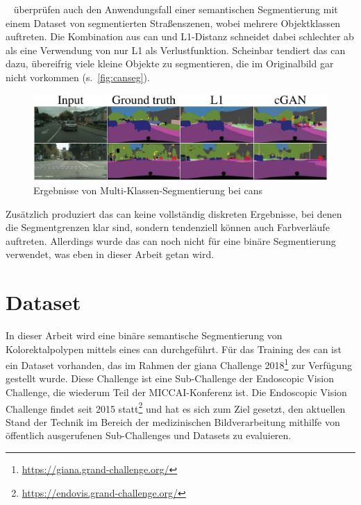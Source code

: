 \citeauthor{Isola.2017}~\cite{Isola.2017} überprüfen auch den Anwendungsfall einer semantischen Segmentierung mit einem Dataset von segmentierten Straßenszenen, wobei mehrere Objektklassen auftreten.
Die Kombination aus \gls{can} und L1-Distanz schneidet dabei schlechter ab als eine Verwendung von nur L1 als Verlustfunktion.
Scheinbar tendiert das \gls{can} dazu, übereifrig viele kleine Objekte zu segmentieren, die im Originalbild gar nicht vorkommen (s.~\autoref{fig:canseg}).

\begin{figure}
	\centering
	\includegraphics[width=0.95\linewidth]{img/can_seg}
	\caption[Ergebnisse von Multi-Klassen-Segmentierung bei \glspl{can}]{Ergebnisse von Multi-Klassen-Segmentierung bei \glspl{can}~\cite{Isola.2017}}
	\label{fig:canseg}
\end{figure}

Zusätzlich produziert das \gls{can} keine vollständig diskreten Ergebnisse, bei denen die Segmentgrenzen klar sind, sondern tendenziell können auch Farbverläufe auftreten.
Allerdings wurde das \gls{can} noch nicht für eine binäre Segmentierung verwendet, was eben in dieser Arbeit getan wird.



\section{Dataset}

In dieser Arbeit wird eine binäre semantische Segmentierung von Kolorektalpolypen mittels eines \gls{can} durchgeführt.
Für das Training des \gls{can} ist ein Dataset vorhanden, das im Rahmen der \gls{giana} Challenge 2018\footnote{\url{https://giana.grand-challenge.org/}} zur Verfügung gestellt wurde.
Diese Challenge ist eine Sub-Challenge der Endoscopic Vision Challenge, die wiederum Teil der MICCAI-Konferenz ist.
Die Endoscopic Vision Challenge findet seit 2015 statt\footnote{\url{https://endovis.grand-challenge.org/}} und hat es sich zum Ziel gesetzt, den aktuellen Stand der Technik im Bereich der medizinischen Bildverarbeitung mithilfe von öffentlich ausgerufenen Sub-Challenges und Datasets zu evaluieren.

